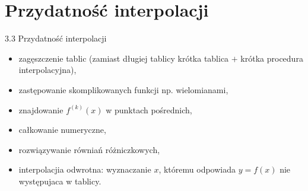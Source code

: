 \section{Przydatność interpolacji}
	\begin{frame}{3.3 Przydatność interpolacji}
	
\begin{itemize}

	\item zagęszczenie tablic (zamiast długiej tablicy krótka tablica $+$ krótka procedura interpolacyjna), \newline
    \item zastępowanie skomplikowanych funkcji np. wielomianami, \newline
    \item znajdowanie $f^{(k)}(x)$ w punktach pośrednich, \newline
    \item całkowanie numeryczne, \newline
    \item rozwiązywanie równiań różniczkowych, \newline
    \item interpolacjia odwrotna: wyznaczanie $x$, któremu odpowiada $y = f(x)$ nie występujaca w tablicy.
     \end{itemize}

	\end{frame}